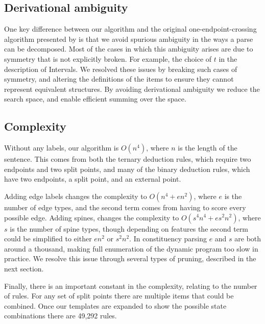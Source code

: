 \subsection{Derivational ambiguity}

One key difference between our algorithm and the original one-endpoint-crossing algorithm presented by \textcite{ec} is that we avoid spurious ambiguity in the ways a parse can be decomposed.
Most of the cases in which this ambiguity arises are due to symmetry that is not explicitly broken.
For example, the choice of $t$ in the description of Intervals.
We resolved these issues by breaking such cases of symmetry, and altering the definitions of the items to ensure they cannot represent equivalent structures.
By avoiding derivational ambiguity we reduce the search space, and enable efficient summing over the space.

\subsection{Complexity}

Without any labels, our algorithm is $O(n^4)$, where $n$ is the length of the sentence.
This comes from both the ternary deduction rules, which require two endpoints and two split points, and many of the binary deduction rules, which have two endpoints, a split point, and an external point.

Adding edge labels changes the complexity to $O(n^4 + e n^2)$, where $e$ is the number of edge types, and the second term comes from having to score every possible edge.
Adding spines, changes the complexity to $O(s^4 n^4 + e s^2 n^2)$, where $s$ is the number of spine types, though depending on features the second term could be simplified to either $e n^2$ or $s^2 n^2$.
In constituency parsing $e$ and $s$ are both around a thousand, making full enumeration of the dynamic program too slow in practice.
We resolve this issue through several types of pruning, described in the next section.

Finally, there is an important constant in the complexity, relating to the number of rules.
For any set of split points there are multiple items that could be combined.
Once our templates are expanded to show the possible state combinations there are 49,292 rules.


